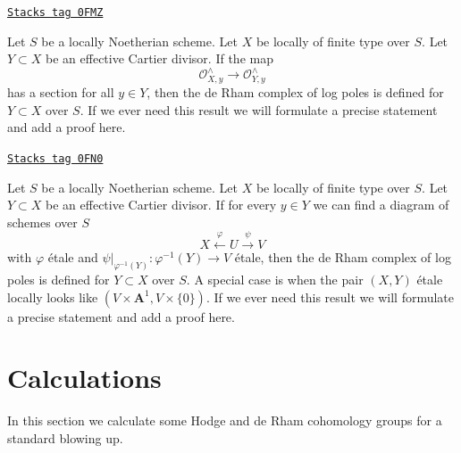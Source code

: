 \begin{remark}
\label{derham-remark-check-log-completion-1}
\href{https://stacks.math.columbia.edu/tag/0FMZ}{\texttt{Stacks tag 0FMZ}}

Let $S$ be a locally Noetherian scheme. Let $X$ be locally of finite
type over $S$. Let $Y \subset X$ be an effective Cartier divisor.
If the map
$$
\mathcal{O}_{X, y}^\wedge \longrightarrow \mathcal{O}_{Y, y}^\wedge
$$
has a section for all $y \in Y$, then
the de Rham complex of log poles is defined for $Y \subset X$ over $S$.
If we ever need this result we will formulate a precise statement and
add a proof here.
\end{remark}

\begin{remark}
\label{derham-remark-check-log-completion-2}
\href{https://stacks.math.columbia.edu/tag/0FN0}{\texttt{Stacks tag 0FN0}}

Let $S$ be a locally Noetherian scheme. Let $X$ be locally of finite
type over $S$. Let $Y \subset X$ be an effective Cartier divisor.
If for every $y \in Y$ we can find a diagram of schemes over $S$
$$
X \xleftarrow{\varphi} U \xrightarrow{\psi} V
$$
with $\varphi$ \'etale and $\psi|_{\varphi^{-1}(Y)} : \varphi^{-1}(Y) \to V$
\'etale, then the de Rham complex of log poles is defined for
$Y \subset X$ over $S$. A special case is when the pair $(X, Y)$
\'etale locally looks like $(V \times \mathbf{A}^1, V \times \{0\})$.
If we ever need this result we will formulate
a precise statement and add a proof here.
\end{remark}

\section{Calculations}
\label{derham-section-calculations}
In this section we calculate some Hodge and de Rham cohomology
groups for a standard blowing up.

